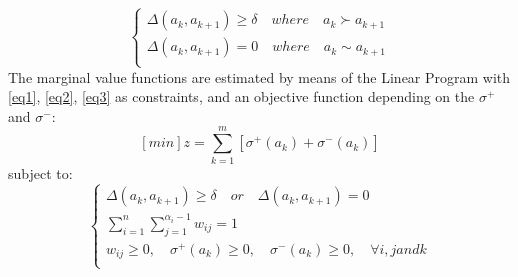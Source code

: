 \documentclass{report}
\begin{document}
\begin{equation}\label{eq3}
\begin{cases}
\Delta (a_k, a_{k+1} ) \geq \delta \quad where\quad a_k \succ a_{k+1}\\
\Delta (a_k, a_{k+1} ) = 0 \quad where\quad a_k \sim a_{k+1} \\
\end{cases}
\end{equation}
The marginal value functions are estimated by means of the Linear Program with \eqref{eq1}, \eqref{eq2}, \eqref{eq3} as constraints, and an objective function depending on the $ \sigma^{+}$ and $\sigma^{-} $: 
$$ [min]z = \sum_{k=1}^{m} [ \sigma ^{+} (a_k) + \sigma ^{-} (a_k)] $$
subject to: 
\begin{equation}\label{eq5}
\begin{cases}
\Delta (a_k, a_{k+1} ) \geq \delta \quad or \quad \Delta (a_k, a_{k+1} ) = 0 \\
\sum_{i=1}^{n} \sum_{j=1}^{\alpha_i -1} w_{ij} = 1\\
w_{ij} \geq 0, \quad \sigma^{+}(a_k) \geq 0, \quad \sigma^{-}(a_k) \geq 0, \quad \forall i, j and k\\
\end{cases}
\end{equation}
\end{document}

